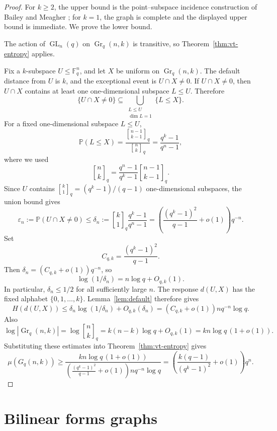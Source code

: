 \documentclass[11pt]{article}
\theoremstyle{definition}
\theoremstyle{remark}
\newcommand{\F}{\mathbb F}
\newcommand{\Gr}{\operatorname{Gr}}
\newcommand{\Prob}{\mathbb P}
\newcommand{\eps}{\varepsilon}
\newcommand{\qbinom}[2]{\genfrac{[}{]}{0pt}{}{#1}{#2}_q}
\begin{document}
\begin{proof}
For \(k\geq2\), the upper bound is the point--subspace incidence
construction of Bailey and Meagher \cite[Theorem~5]{BaileyMeagher}; for
\(k=1\), the graph is complete and the displayed upper bound is immediate.
We prove the lower bound.

The action of \(\operatorname{GL}_n(q)\) on \(\Gr_q(n,k)\) is transitive,
so Theorem~\ref{thm:vt-entropy} applies.

Fix a \(k\)-subspace \(U\leq\F_q^n\), and let \(X\) be uniform on 
\(\Gr_q(n,k)\).  The default distance from \(U\) is \(k\), and the 
exceptional event is \(U\cap X\neq0\).  If \(U\cap X\neq0\), then \(U\cap 
X\) contains at least one one-dimensional subspace \(L\leq U\).  Therefore
\[
        \{U\cap X\neq0\}
        \subseteq
        \bigcup_{\substack{L\leq U\\ \dim L=1}}\{L\leq X\}.
\]
For a fixed one-dimensional subspace \(L\leq U\),
\[
        \Prob(L\leq X)
        =
        \frac{\qbinom{n-1}{k-1}}{\qbinom nk}
        =
        \frac{q^k-1}{q^n-1},
\]
where we used
\[
        \qbinom nk
        =
        \frac{q^n-1}{q^k-1}\qbinom{n-1}{k-1}.
\]
Since \(U\) contains \(\qbinom k1=(q^k-1)/(q-1)\) one-dimensional
subspaces, the union bound 
gives
\[
        \eps_n:=\Prob(U\cap X\neq0)
        \leq
        \delta_n:=\qbinom k1\frac{q^k-1}{q^n-1}
        =
        \left(\frac{(q^k-1)^2}{q-1}+o(1)\right)q^{-n}.
\]
Set
\[
        C_{q,k}=\frac{(q^k-1)^2}{q-1}.
\]
Then \(\delta_n=(C_{q,k}+o(1))q^{-n}\), so
\[
        \log(1/\delta_n)=n\log q+O_{q,k}(1).
\]
In particular, \(\delta_n\leq1/2\) for all sufficiently large \(n\).
The response \(d(U,X)\) has the fixed alphabet \(\{0,1,\ldots,k\}\).  
Lemma~\ref{lem:default} therefore gives
\[
        H(d(U,X))
        \leq
        \delta_n\log(1/\delta_n)+O_{q,k}(\delta_n)
        =
        (C_{q,k}+o(1))nq^{-n}\log q.
\]
Also
\[
        \log |\Gr_q(n,k)|
        =
        \log\qbinom nk
        =
        k(n-k)\log q+O_{q,k}(1)
        =
        kn\log q\,(1+o(1)).
\]
Substituting these estimates into Theorem~\ref{thm:vt-entropy} gives
\[
        \mu(G_q(n,k))
        \geq
        \frac{kn\log q\,(1+o(1))}
        {\left(\frac{(q^k-1)^2}{q-1}+o(1)\right)nq^{-n}\log q}
        =
        \left(\frac{k(q-1)}{(q^k-1)^2}+o(1)\right)q^n.
\]
\end{proof}

\section{Bilinear forms graphs}\label{sec:bilinear}
\end{document}
